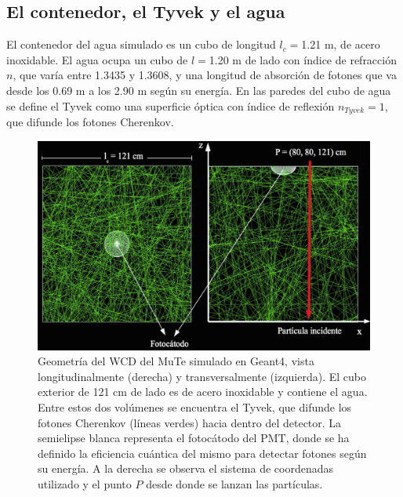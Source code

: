 \documentclass[12pt,oneside,openany,letter]{book}
\begin{document}
\subsection{El contenedor, el Tyvek y el agua}
El contenedor del agua simulado es un cubo de longitud $l_c=$1.21 m, de acero inoxidable. El agua ocupa un cubo de $l=$1.20 m de lado con índice de refracción $n$, que var\'ia entre 1.3435 y 1.3608, y una longitud de absorción de fotones que va desde los 0.69 m a los 2.90 m según su energía. En las paredes del cubo de agua se define el Tyvek como una superficie óptica con índice de reflexión $n_{Tyvek}=1$, que difunde los fotones Cherenkov.

\begin{figure}[h!]
    \centering    \includegraphics[width=\textwidth]{images/wcd_punto.png}
   \caption[Geometría del WCD del MuTe simulado en Geant4]{Geometría del WCD del MuTe simulado en Geant4, vista longitudinalmente (derecha) y transversalmente (izquierda). El cubo exterior de 121 cm de lado es de acero inoxidable y contiene el agua. Entre estos dos volúmenes se encuentra el Tyvek, que difunde los fotones Cherenkov (líneas verdes) hacia dentro del detector. La semielipse blanca representa el fotocátodo del PMT, donde se ha definido la eficiencia cu\'antica del mismo para detectar fotones seg\'un su energ\'ia. A la derecha se observa el sistema de coordenadas utilizado y el punto $P$ desde donde se lanzan las partículas.}\label{wcd}
\end{figure}

\end{document}
